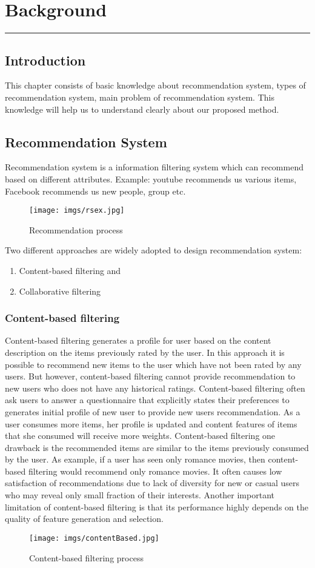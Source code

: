 \documentclass[document.tex]{subfiles}
\begin{document}
\chapter{Background}
\hrule
\newpage

\section{Introduction}
\noindent This chapter consists of basic knowledge about recommendation system, types of recommendation system, main problem of recommendation system. This knowledge will help us to understand clearly about our proposed method.
\section{Recommendation System}
Recommendation system is a information filtering system which can recommend based on different attributes. Example: youtube recommends us various items, Facebook recommends us new people, group etc.
\begin{figure}[H]
	\centering
	\texttt{[image: imgs/rsex.jpg]}
	\caption[Recommendation process]
	{Recommendation process}
\end{figure}
Two different approaches are widely adopted to design recommendation system: 
\begin{enumerate}
	\item Content-based filtering and 
	\item Collaborative filtering
\end{enumerate}

\subsection{Content-based filtering}
Content-based filtering generates a profile for user based on the content description on the items previously rated by the user. In this approach it is possible to recommend new items to the user which have not been rated by any users. But however, content-based filtering cannot provide recommendation to new users who does not have any historical ratings. Content-based filtering often ask users to answer a questionnaire that explicitly states their preferences to generates initial profile of new user to provide new users recommendation. As a user consumes more items, her profile is updated and content features of items that she consumed will receive more weights. Content-based filtering one drawback is the recommended items are similar to the items previously consumed by the user. As example, if a user has seen only romance movies, then content-based filtering would recommend only romance movies. It often causes low satisfaction of recommendations due to lack of diversity for new or casual users who may reveal only small fraction of their interests. Another important limitation of content-based filtering is that its performance highly depends on the quality of feature generation and selection.
\begin{figure}[H]
	\centering
	\texttt{[image: imgs/contentBased.jpg]}
	\caption[Content-based filtering process]
	{Content-based filtering process}
\end{figure}
\end{document}
